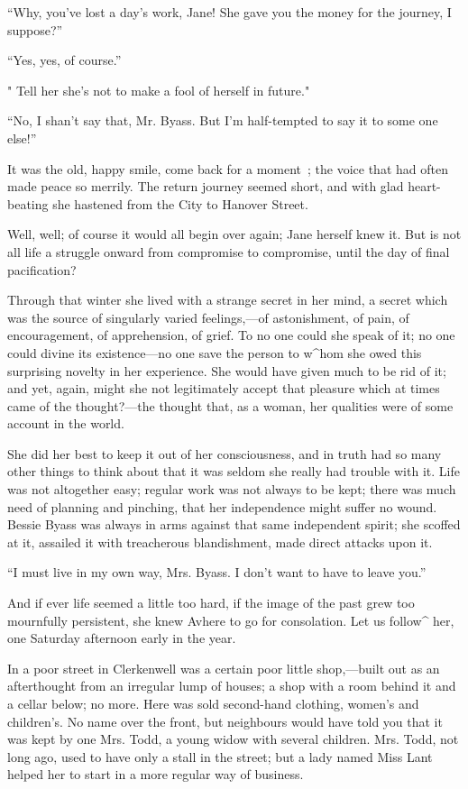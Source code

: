 ``Why, you've lost a day's work, Jane! She gave you the money for the
journey, I suppose?''

``Yes, yes, of course.''

" Tell her she's not to make a fool of herself in future."

``No, I shan't say that, Mr. Byass. But I'm half-tempted to say it to
some one else!''

It was the old, happy smile, come back for a moment~; the voice that had
often made peace so merrily. The return journey seemed short, and with
glad heart-beating she hastened from the City to Hanover Street.

Well, well; of course it would all begin over again; Jane herself knew
it. But is not all life a struggle onward from compromise to compromise,
until the day of final pacification?

Through that winter she lived with a strange secret in her mind, a
secret which was the source of singularly varied feelings,---of
astonishment, of pain, of encouragement, of apprehension, of grief. To
no one could she speak of it; no one could divine its existence---no one
save the person to w\^{}hom she owed this surprising novelty in her
experience. She would have {\protect\hypertarget{299}{}{}} given much to
be rid of it; and yet, again, might she not legitimately accept that
pleasure which at times came of the thought?---the thought that, as a
woman, her qualities were of some account in the world.

She did her best to keep it out of her consciousness, and in truth had
so many other things to think about that it was seldom she really had
trouble with it. Life was not altogether easy; regular work was not
always to be kept; there was much need of planning and pinching, that
her independence might suffer no wound. Bessie Byass was always in arms
against that same independent spirit; she scoffed at it, assailed it
with treacherous blandishment, made direct attacks upon it.

``I must live in my own way, Mrs. Byass. I don't want to have to leave
you.''

And if ever life seemed a little too hard, if the image of the past grew
too mournfully persistent, she knew Avhere to go for consolation. Let us
follow\^{} her, one Saturday afternoon early in the year.

In a poor street in Clerkenwell was a certain poor little shop,---built
out as an afterthought from an irregular lump of houses; a shop with
{\protect\hypertarget{300}{}{}} a room behind it and a cellar below; no
more. Here was sold second-hand clothing, women's and children's. No
name over the front, but neighbours would have told you that it was kept
by one Mrs. Todd, a young widow with several children. Mrs. Todd, not
long ago, used to have only a stall in the street; but a lady named Miss
Lant helped her to start in a more regular way of business.

